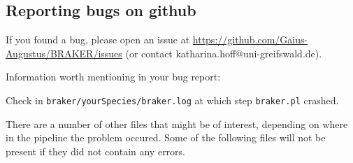 \documentclass[]{article}
\begin{document}
\hypertarget{reporting-bugs-on-github}{\subsection{Reporting bugs on
github}\label{reporting-bugs-on-github}}

If you found a bug, please open an issue at
\url{https://github.com/Gaius-Augustus/BRAKER/issues} (or contact
katharina.hoff@uni-greifswald.de).

Information worth mentioning in your bug report:

Check in \texttt{braker/yourSpecies/braker.log} at which step
\texttt{braker.pl} crashed.

There are a number of other files that might be of interest, depending
on where in the pipeline the problem occured. Some of the following
files will not be present if they did not contain any errors.
\end{document}
